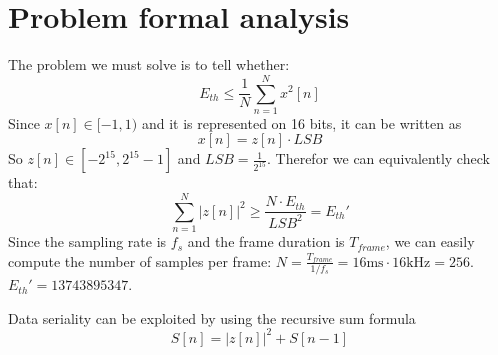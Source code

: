 \section{Problem formal analysis}
The problem we must solve is to tell whether:
\begin{equation*}
  E_{th} \le \frac{1}{N} \sum_{n=1}^N x^2[n]
\end{equation*}
Since $ x[n] \in [-1, 1) $ and it is represented on 16 bits, it can be
written as
\begin{equation*}
  x[n] = z[n]\cdot LSB
\end{equation*}
So $z[n] \in [-2^{15}, 2^{15} - 1]$ and $LSB = \frac{1}{2^{15}}$. Therefor we
can equivalently check that:
\begin{equation*}
  \sum_{n=1}^N |z[n]|^2 \ge \frac{N \cdot E_{th}}{LSB^2} = E_{th}'
\end{equation*}
Since the sampling rate is $f_s$ and the frame duration is $T_{frame}$,
we can easily compute the number of samples per frame:
$N = \frac{T_{frame}}{1/f_s} = 16\si{\milli\second} \cdot 16\si{\kilo\hertz} = 256$.
$E_{th}' = 13743895347$.

Data seriality can be exploited by using the recursive sum formula
\begin{equation*}
  S[n] = |z[n]|^2 + S[n - 1]
\end{equation*}
